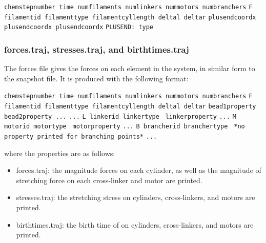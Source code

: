 \documentclass[11pt, oneside]{article}   	%
\begin{document}
\noindent\texttt{chemstepnumber time numfilaments numlinkers nummotors numbranchers}\newline
\texttt{F filamentid filamenttype filamentcyllength deltal deltar}\newline
\texttt{plusendcoordx plusendcoordx plusendcoordx}\newline
\texttt{PLUSEND: type}\newline

\subsubsection{forces.traj, stresses.traj, and birthtimes.traj}

The forces file gives the forces on each element in the system, in similar form to the snapshot file. It is produced with the following format:\newline

\noindent\texttt{chemstepnumber time numfilaments numlinkers nummotors numbranchers}\newline
\texttt{F filamentid filamenttype filamentcyllength deltal deltar}\newline
\texttt{bead1property bead2property ...}\newline
\texttt{...}\newline
\texttt{L linkerid linkertype }\newline
\texttt{linkerproperty}\newline
\texttt{...}\newline
\texttt{M motorid motortype }\newline
\texttt{motorproperty}\newline
\texttt{...}\newline
\texttt{B brancherid branchertype }\newline
\texttt{*no property printed for branching points*}\newline
\texttt{...}\newline

\noindent where the properties are as follows:
\begin{itemize}
\item forces.traj: the magnitude forces on each cylinder, as well as the magnitude of stretching force on each cross-linker and motor are printed.
\item stresses.traj: the stretching stress on cylinders, cross-linkers, and motors are printed.
\item birthtimes.traj: the birth time of on cylinders, cross-linkers, and motors are printed.

\end{itemize}
\end{document}

